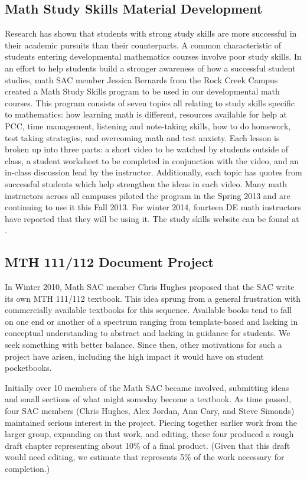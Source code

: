 \subsection{Math Study Skills Material Development}\label{cur:sub:studyskills}
Research has shown that students with strong study skills are more successful in
their academic pursuits than their counterparts.  A common characteristic of
students entering developmental mathematics courses involve poor study skills.
In an effort to help students build a stronger awareness of how a successful
student studies, math SAC member Jessica Bernards from the Rock Creek Campus
created a Math Study Skills program to be used in our developmental math
courses.  This program consists of seven topics all relating to study skills
specific to mathematics: how learning math is different, resources available for
help at PCC, time management, listening and note-taking skills, how to do
homework, test taking strategies, and overcoming math and test anxiety.  Each
lesson is broken up into three parts: a short video to be watched by students
outside of class, a student worksheet to be completed in conjunction with the
video, and an in-class discussion lead by the instructor. Additionally, each
topic has quotes from successful students which help strengthen the ideas in
each video.  Many math instructors across all campuses piloted the program in
the Spring 2013 and are continuing to use it this Fall 2013. For winter 2014,
fourteen DE math instructors have reported that they will be using it. The study
skills website can be found at \cite{studyskills}.
 
\subsection{MTH 111/112 Document Project}\label{cur:sec:111/112doc}
In Winter 2010, Math SAC member Chris Hughes proposed that the SAC write its own
MTH 111/112 textbook. This idea sprung from a general frustration with
commercially available textbooks for this sequence.  Available books tend to
fall on one end or another of a spectrum ranging from template-based and lacking
in conceptual understanding to abstract and lacking in guidance for students.
We seek something with better balance.  Since then, other motivations for such a
project have arisen, including the high impact it would have on student
pocketbooks.

Initially over 10 members of the Math SAC became involved, submitting ideas and
small sections of what might someday become a textbook.  As time passed, four
SAC members (Chris Hughes, Alex Jordan, Ann Cary, and Steve Simonds) maintained
serious interest in the project.  Piecing together earlier work from the larger
group, expanding on that work, and editing, these four produced a rough draft
chapter representing about 10\% of a final product. (Given that this draft would
need editing, we estimate that represents 5\% of the work necessary for
completion.)

